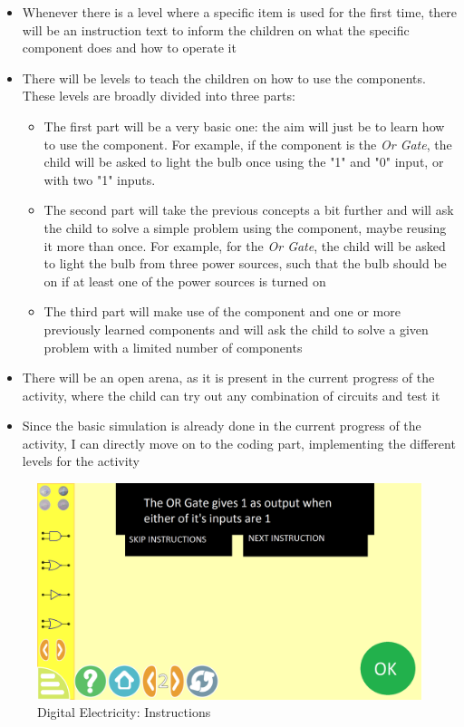\documentclass[preprint,12pt]{elsarticle}
\begin{document}
\begin{itemize}
\item Whenever there is a level where a specific item is used for the first time, there will be an instruction text to inform the children on what the specific component does and how to operate it
\item There will be levels to teach the children on how to use the components. These levels are broadly divided into three parts:
\begin{itemize}
\item The first part will be a very basic one: the aim will just be to learn how to use the component. For example, if the component is the \textit{Or Gate}, the child will be asked to light the bulb once using the "1" and "0" input, or with two "1" inputs.
\item The second part will take the previous concepts a bit further and will ask the child to solve a simple problem using the component, maybe reusing it more than once. For example, for the \textit{Or Gate}, the child will be asked to light the bulb from three power sources, such that the bulb should be on if at least one of the power sources is turned on
\item The third part will make use of the component and one or more previously learned components and will ask the child to solve a given problem with a limited number of components
\end{itemize}
\item There will be an open arena, as it is present in the current progress of the activity, where the child can try out any combination of circuits and test it
\item Since the basic simulation is already done in the current progress of the activity, I can directly move on to the coding part, implementing the different levels for the activity
\end{itemize}

\begin{figure}[H]
\centering\includegraphics[width=1.0\linewidth]{digital_electricity}
\caption{Digital Electricity: Instructions}
\end{figure}
\end{document}
